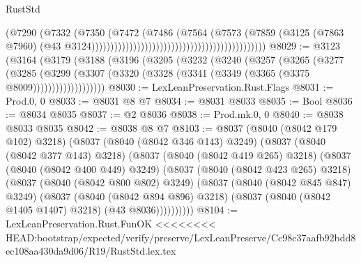 \begin{lexlean}{RustStd}
\begin{coremodule}
{\begin{coremodule}
{{{{{{{{{{{{{{{{{{{{{{{{{{{{{{{{{{{{{{{{{{{{{                                                                            (@7290
                                                                              (@7332
                                                                                (@7350
                                                                                  (@7472
                                                                                    (@7486
                                                                                      (@7564
                                                                                        (@7573
                                                                                          (@7859
                                                                                            (@3125
                                                                                              (@7863
                                                                                                @7960)
                                                                                              (@43
                                                                                                @3124))))))))))))))))))))))))))))))))))))))))))))))
@8029 := @3123
    (@3164
      (@3179
        (@3188
          (@3196
            (@3205
              (@3232
                (@3240
                  (@3257
                    (@3265
                      (@3277
                        (@3285
                          (@3299
                            (@3307
                              (@3320 (@3328 (@3341 (@3349 (@3365 (@3375 @8009)))))))))))))))))))
@8030 := LexLeanPreservation.Rust.Flags
@8031 := Prod.{0, 0}
@8033 := @8031 @8 @7
@8034 := @8031 @8033
@8035 := Bool
@8036 := @8034 @8035
@8037 := @2 @8036
@8038 := Prod.mk.{0, 0}
@8040 := @8038 @8033 @8035
@8042 := @8038 @8 @7
@8103 := @8037
    (@8040 (@8042 @179 @102) @3218)
    (@8037
      (@8040 (@8042 @346 @143) @3249)
      (@8037
        (@8040 (@8042 @377 @143) @3218)
        (@8037
          (@8040 (@8042 @419 @265) @3218)
          (@8037
            (@8040 (@8042 @400 @449) @3249)
            (@8037
              (@8040 (@8042 @423 @265) @3218)
              (@8037
                (@8040 (@8042 @800 @802) @3249)
                (@8037
                  (@8040 (@8042 @845 @847) @3249)
                  (@8037
                    (@8040 (@8042 @894 @896) @3218)
                    (@8037 (@8040 (@8042 @1405 @1407) @3218) (@43 @8036))))))))))
@8104 := LexLeanPreservation.Rust.FunOK
<<<<<<<< HEAD:bootstrap/expected/verify/preserve/LexLeanPreserve/Cc98c37aafb92bdd8ec108aa430da9d06/R19/RustStd.lex.tex
}}}}}}}}}}}}}}}}}}}}}}}}}}}}}}}}}}}}}}}}}}}}}
\end{coremodule}}
\end{coremodule}
\end{lexlean}
